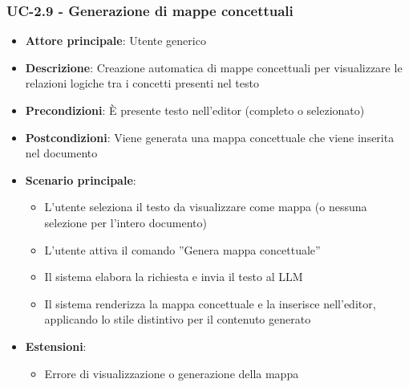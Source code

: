 \documentclass[11pt,a4paper]{article}
\begin{document}
\subsubsection{UC-2.9 - Generazione di mappe concettuali}
\begin{itemize}
    \item \textbf{Attore principale}: Utente generico
    \item \textbf{Descrizione}: Creazione automatica di mappe concettuali per visualizzare le relazioni logiche tra i concetti presenti nel testo
    \item \textbf{Precondizioni}: È presente testo nell’editor (completo o selezionato)
    \item \textbf{Postcondizioni}: Viene generata una mappa concettuale che viene inserita nel documento
    \item \textbf{Scenario principale}:
    \begin{itemize}
        \item L’utente seleziona il testo da visualizzare come mappa (o nessuna selezione per l'intero documento)
        \item L’utente attiva il comando ”Genera mappa concettuale”
        \item Il sistema elabora la richiesta e invia il testo al LLM
        \item Il sistema renderizza la mappa concettuale e la inserisce nell'editor, applicando lo stile distintivo per il contenuto generato
    \end{itemize}
    \item \textbf{Estensioni}:
    \begin{itemize}
        \item Errore di visualizzazione o generazione della mappa
    \end{itemize}
\end{itemize}
\end{document}
